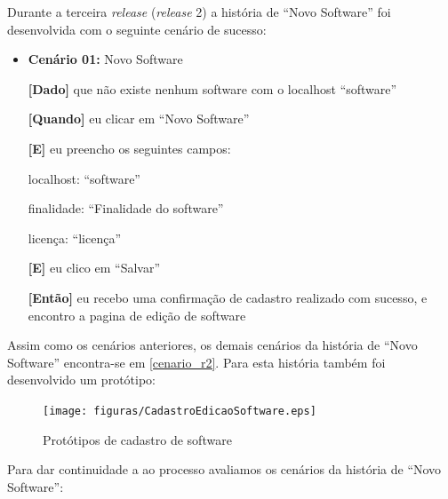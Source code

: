 Durante a terceira \textit{release} (\textit{release} 2) a história de ``Novo Software'' foi desenvolvida com o seguinte cenário de sucesso:

\begin{itemize}
\item\textbf{Cenário 01:} Novo Software

	\textbf{[Dado]} que não existe nenhum software com o localhost ``software''

	\textbf{[Quando]} eu clicar em ``Novo Software''

	\textbf{[E]} eu preencho os seguintes campos: 

  		\subitem localhost: ``software''

  		\subitem finalidade: ``Finalidade do software''

  		\subitem licença: ``licença''
  		
  		
	\textbf{[E]} eu clico em ``Salvar''

	\textbf{[Então]} eu recebo uma confirmação de cadastro realizado com sucesso, e encontro a pagina de edição de software
\end{itemize}
Assim como os cenários anteriores, os demais cenários da história de ``Novo Software'' encontra-se em \ref{cenario_r2}. Para esta história também foi desenvolvido um protótipo:

	\begin{figure}[h!]
    	\centering
    	\texttt{[image: figuras/CadastroEdicaoSoftware.eps]}
    	\caption{Protótipos de cadastro de software}
    	\label{cadastro software}
	\end{figure}


Para dar continuidade a ao processo avaliamos os cenários da história de ``Novo Software'': 


